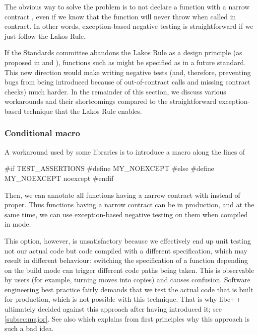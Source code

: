 The obvious way to solve the  problem is to not declare a function with a narrow contract , even if we know that the function will never throw when called in contract. In other words, exception-based negative testing is straightforward if we just follow the Lakos Rule. 

If the Standards committee abandons the Lakos Rule as a design principle (as proposed in \cite{P1656R2} and \cite{P2148R0}), functions such as \mbox{} might be specified as  in a future standard. This new direction would make writing negative tests (and, therefore, preventing bugs from being introduced because of out-of-contract calls and missing contract checks) much harder. In the remainder of this section, we discuss various workarounds and their shortcomings compared to the straightforward exception-based technique that the Lakos Rule enables.

\subsubsection{Conditional  macro}
\label{subsubsec:conditional}

A workaround used by some libraries is to introduce a macro along the lines of
\begin{codeblock}
#if TEST_ASSERTIONS
  #define MY_NOEXCEPT 
#else
  #define MY_NOEXCEPT noexcept
#endif
\end{codeblock}
Then, we can annotate all functions having a narrow contract with  instead of  proper. Thus functions having a narrow contract can be  in production, and at the same time, we can use exception-based negative testing on them when compiled in \mbox{} mode.

This option, however, is unsatisfactory because we effectively end up unit testing not our actual code but code compiled with a different specification, which may result in different behaviour: switching the  specification of a function depending on the build mode can trigger different code paths being taken. This is observable by users (for example, turning moves into copies) and causes confusion. Software engineering best practice fairly demands that we test the actual code that is built for production, which is not possible with this technique. That is why libc++ ultimately decided against this approach after having introduced it; see \ref{subsec:major}. See also \cite{P2834R0} which explains from first principles why this approach is such a bad idea.

